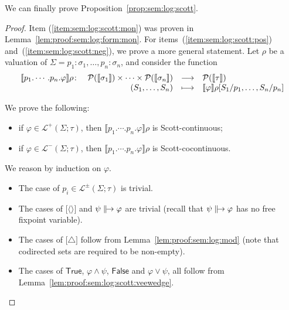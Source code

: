 \documentclass[%
  a4paper,
  UKenglish,
  cleveref,
  autoref,
  thm-restate,
  numberwithinsect,
]{lipics-v2021}
\newcommand\longto\longrightarrow
\newcommand\pair[1]{{\langle #1\rangle}}
\newcommand\Po{\mathcal{P}}		%
\newcommand\I[1]{\llbracket #1 \rrbracket} %
\newcommand\SP{S}			%
\newcommand\temp[1]{\mathsf{#1}}
\newcommand\True{\temp{True}}
\newcommand\False{\temp{False}}
\newcommand\val{\rho}	%
\newcommand\defrealto{\mathrel\parallel\joinrel\to}
\newcommand\realto{\mathrel{\defrealto}}
\newcommand\PT{\tau}		%
\newcommand\PTbis{\sigma}	%
\newcommand\FP{p}
\newcommand\FPEnv{\Sigma}
\newcommand\Lang{\mathcal{L}}
\newcommand\form[1]{\lbrack #1 \rbrack}
\newcommand\modgen{\mathord{\triangle}}	%
\begin{document}
We can finally prove Proposition~\ref{prop:sem:log:scott}.

\PropFormScott*

\begin{proof}
Item (\ref{item:sem:log:scott:mon})
was proven in Lemma~\ref{lem:proof:sem:log:form:mon}.
For items~(\ref{item:sem:log:scott:pos}) and~(\ref{item:sem:log:scott:neg}),
we prove a more general statement.
Let $\val$ be a valuation of
$\FPEnv = \FP_1\colon \PTbis_1, \dots, \FP_n\colon \PTbis_n$,
and consider the function
\[
\begin{array}{l r c l}
  \I{\FP_1.\cdots.\FP_n.\varphi}\val \colon
& \Po(\I{\PTbis_1}) \times \dots \times \Po(\I{\PTbis_n})
& \longto
& \Po(\I{\PT})
\\
%
& (\SP_1,\dots,\SP_n)
& \longmapsto
& \I{\varphi}\val[\SP_1 / \FP_1, \dots, \SP_n / \FP_n]
\end{array}
\]

\noindent
We prove the following:
\begin{itemize}
\item
if $\varphi \in \Lang^+(\FPEnv;\PT)$,
then 
$\I{\FP_1.\cdots.\FP_n.\varphi}\val$
is Scott-continuous;

\item
if $\varphi \in \Lang^-(\FPEnv;\PT)$,
then 
$\I{\FP_1.\cdots.\FP_n.\varphi}\val$
is Scott-cocontinuous.
\end{itemize}

\noindent
We reason by induction on $\varphi$.
\begin{itemize}
\item
The case of $\FP_i \in \Lang^\pm(\FPEnv;\PT)$ is trivial.

\item
The cases of $\form{\pair{}}$
and $\psi \realto \varphi$ are trivial
(recall that $\psi \realto \varphi$ has no free fixpoint variable).

\item
The cases of $\form\modgen$ follow from Lemma~\ref{lem:proof:sem:log:mod}
(note that codirected sets are required to be non-empty).

\item
The cases of $\True$, $\varphi \land \psi$, $\False$ and $\varphi \lor \psi$,
all follow from Lemma~\ref{lem:proof:sem:log:scott:veewedge}.


\end{itemize}
\end{proof}
\end{document}
